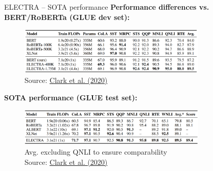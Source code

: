 \documentclass[]{beamer}
\begin{document}
\begin{frame}{ELECTRA -- SOTA performance}
\small
	\textbf{Performance differences vs. BERT/RoBERTa (GLUE dev set):}

	\begin{figure}
		\centering
		\includegraphics[width = 9cm]{figure/electra-sota1.png}\\ 
		{\footnotesize Source: \href{https://arxiv.org/pdf/2003.10555.pdf}{Clark et al. (2020)}}
	\end{figure}

	\textbf{SOTA performance (GLUE test set):}

	\begin{figure}
		\centering
		\includegraphics[width = 9cm]{figure/electra-sota2.png}\\ 
		{\tiny * Avg. excluding QNLI to ensure comparability\\\footnotesize Source: \href{https://arxiv.org/pdf/2003.10555.pdf}{Clark et al. (2020)}}
	\end{figure}
\end{frame}
\end{document}
